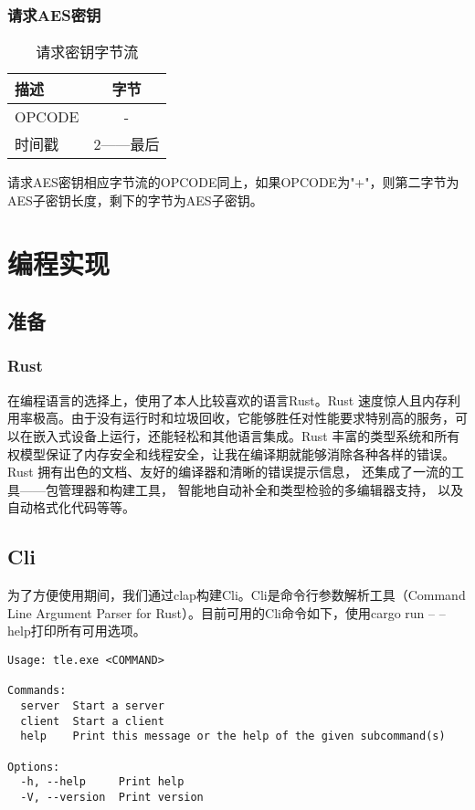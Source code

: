 \documentclass{ctexart}
\begin{document}
\subsubsection{请求AES密钥}
\begin{table}[htbp]
\centering
\caption{请求密钥字节流}
\label{tab:byte_stream}
\begin{tabular}{lc}
\toprule
\textbf{描述} & \textbf{字节} \\
\midrule
OPCODE & - \\
时间戳 & 2——最后 \\
\bottomrule
\end{tabular}
\end{table}

请求AES密钥相应字节流的OPCODE同上，如果OPCODE为"+"，则第二字节为AES子密钥长度，剩下的字节为AES子密钥。

\newpage
\section{编程实现}

\subsection{准备}

\subsubsection{Rust}

在编程语言的选择上，使用了本人比较喜欢的语言Rust。Rust 速度惊人且内存利用率极高。由于没有运行时和垃圾回收，它能够胜任对性能要求特别高的服务，可以在嵌入式设备上运行，还能轻松和其他语言集成。Rust 丰富的类型系统和所有权模型保证了内存安全和线程安全，让我在编译期就能够消除各种各样的错误。Rust 拥有出色的文档、友好的编译器和清晰的错误提示信息， 还集成了一流的工具——包管理器和构建工具， 智能地自动补全和类型检验的多编辑器支持， 以及自动格式化代码等等。

\subsection{Cli}

为了方便使用期间，我们通过clap构建Cli。Cli是命令行参数解析工具（Command Line Argument Parser for Rust）。目前可用的Cli命令如下，使用cargo run -- --help打印所有可用选项。

\begin{lstlisting}
Usage: tle.exe <COMMAND>

Commands:
  server  Start a server
  client  Start a client
  help    Print this message or the help of the given subcommand(s)

Options:
  -h, --help     Print help
  -V, --version  Print version
\end{lstlisting}
\end{document}
